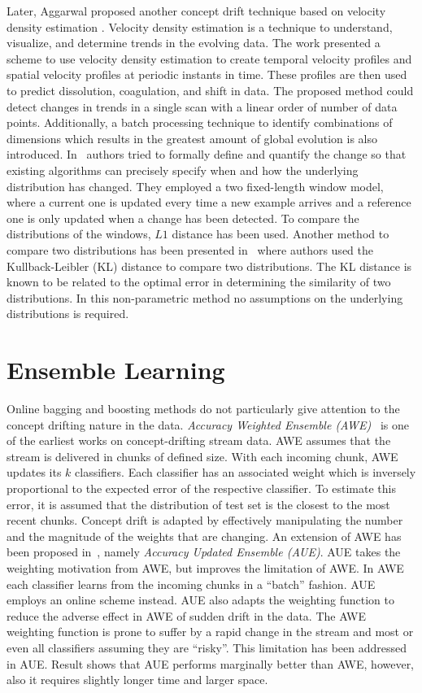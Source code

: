 Later, Aggarwal proposed another concept drift technique based on velocity density estimation \cite{aggarwal03:condrift}. Velocity density estimation is a technique to understand, visualize, and determine trends in the evolving data. The work presented a scheme to use velocity density estimation to create temporal velocity profiles and spatial velocity profiles at periodic instants in time. These profiles are then used to predict dissolution, coagulation, and shift in data. The proposed method could detect changes in trends in a single scan with a linear order of number of data points. Additionally, a batch processing technique to identify combinations of dimensions which results in the greatest amount of global evolution is also introduced. In~\cite{kifer04:condrift} authors tried to formally define and quantify the change so that existing algorithms can precisely specify when and how the underlying distribution has changed. They employed a two fixed-length window model, where a current one is updated every time a new example arrives and a reference one is only updated when a change has been detected. To compare the distributions of the windows, $L1$ distance has been used. Another method to compare two distributions has been presented in~\cite{dasu05:condrift} where authors used the Kullback-Leibler (KL) distance to compare two distributions. The KL distance is known to be related to the optimal error in determining the similarity of two distributions. In this non-parametric method no assumptions on the underlying distributions is required. 


\section*{Ensemble Learning}

Online bagging and boosting methods do not particularly give attention to the concept drifting nature in the data. \textit{Accuracy Weighted Ensemble (AWE)}~\cite{wang03:accuweighted} is one of the earliest works on concept-drifting stream data. AWE assumes that the stream is delivered in chunks of defined size. With each incoming chunk, AWE updates its $k$ classifiers. Each classifier has an associated weight which is inversely proportional to the expected error of the respective classifier. To estimate this error, it is assumed that the distribution of test set is the closest to the most recent chunks. Concept drift is adapted by effectively manipulating the number and the magnitude of the weights that are changing. An extension of AWE has been proposed in~\cite{brzezinski11:accuupdated}, namely \textit{Accuracy Updated Ensemble (AUE)}. AUE takes the weighting motivation from AWE, but improves the limitation of AWE. In AWE each classifier learns from the incoming chunks in a ``batch'' fashion. AUE employs an online scheme instead. AUE also adapts the weighting function to reduce the adverse effect in AWE of sudden drift in the data. The AWE weighting function is prone to suffer by a rapid change in the stream and most or even all classifiers assuming they are ``risky''. This limitation has been addressed in AUE. Result shows that AUE performs marginally better than AWE, however, also it requires slightly longer time and larger space.

